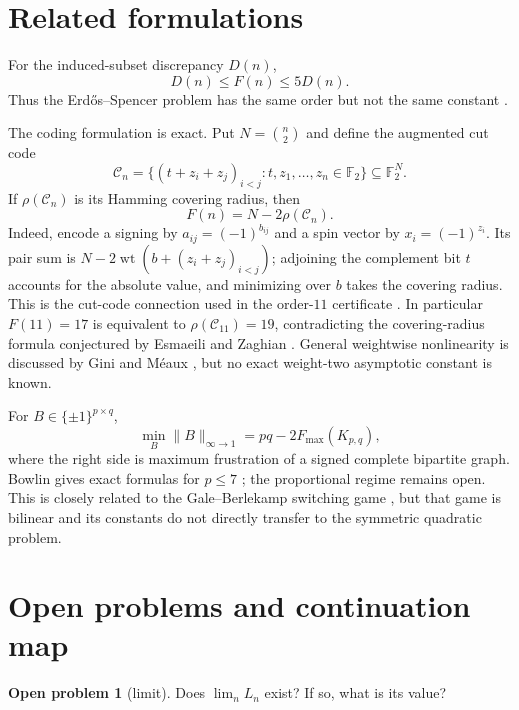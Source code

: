 \documentclass[11pt]{article}
\theoremstyle{definition}
\newtheorem{problem}[theorem]{Open problem}
\theoremstyle{remark}
\begin{document}
\section{Related formulations}

For the induced-subset discrepancy $D(n)$,
\[
 D(n)\le F(n)\le5D(n).
\]
Thus the Erd\H{o}s--Spencer problem has the same order but not the same
constant \cite{erdos-spencer}.

The coding formulation is exact.  Put $N=\binom n2$ and define the augmented
cut code
\[
 \mathcal C_n=
 \{(t+z_i+z_j)_{i<j}:t,z_1,\ldots,z_n\in\mathbb F_2\}
 \subseteq\mathbb F_2^N.
\]
If $\rho(\mathcal C_n)$ is its Hamming covering radius, then
\begin{equation}\label{eq:covering-radius}
 F(n)=N-2\rho(\mathcal C_n).
\end{equation}
Indeed, encode a signing by $a_{ij}=(-1)^{b_{ij}}$ and a spin vector by
$x_i=(-1)^{z_i}$.  Its pair sum is
$N-2\operatorname{wt}(b+(z_i+z_j)_{i<j})$; adjoining the complement bit $t$
accounts for the absolute value, and minimizing over $b$ takes the covering
radius.  This is the cut-code connection used in the order-$11$ certificate
\cite{white-k11}.  In particular $F(11)=17$ is equivalent to
$\rho(\mathcal C_{11})=19$, contradicting the covering-radius formula
conjectured by Esmaeili and Zaghian \cite{esmaeili-zaghian}.  General
weightwise nonlinearity is discussed by Gini and M\'{e}aux
\cite{gini-meaux}, but no exact weight-two asymptotic constant is known.

For $B\in\{\pm1\}^{p\times q}$,
\[
 \min_B\|B\|_{\infty\to1}
 =pq-2F_{\max}(K_{p,q}),
\]
where the right side is maximum frustration of a signed complete bipartite
graph.  Bowlin gives exact formulas for $p\le7$ \cite{bowlin}; the proportional
regime remains open.  This is closely related to the Gale--Berlekamp
switching game \cite{fishburn-sloane,carlson-stolarski,pellegrino-raposo}, but
that game is bilinear and its constants do not directly transfer to the
symmetric quadratic problem.

\section{Open problems and continuation map}

\begin{problem}[limit]
Does $\lim_n L_n$ exist?  If so, what is its value?
\end{problem}
\end{document}
